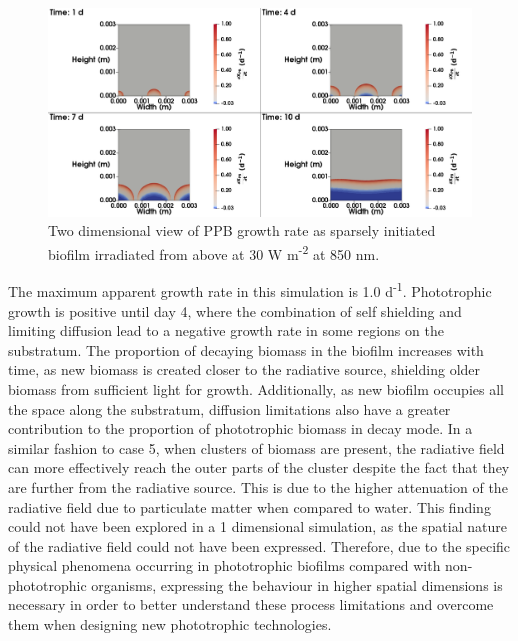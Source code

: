 \begin{figure}[H]
    \centering
    \hspace*{-1cm}\includegraphics[width=1.1\textwidth,height=0.4\textheight]{Chap4/methods/data/figures/case6_growth_frac.png}
    \caption{Two dimensional view of PPB growth rate as sparsely initiated biofilm irradiated from above at 30 W m\textsuperscript{-2} at 850 nm.} 
    \label{fig:case6_growth_frac}
\end{figure}
The maximum apparent growth rate in this simulation is 1.0 d\textsuperscript{-1}. Phototrophic growth is positive until day 4, where the combination of self shielding and limiting diffusion lead to a negative growth rate in some regions on the substratum. The proportion of decaying biomass in the biofilm increases with time, as new biomass is created closer to the radiative source, shielding older biomass from sufficient light for growth. Additionally, as new biofilm occupies all the space along the substratum, diffusion limitations also have a greater contribution to the proportion of phototrophic biomass in decay mode. In a similar fashion to case 5, when clusters of biomass are present, the radiative field can more effectively reach the outer parts of the cluster despite the fact that they are further from the radiative source. This is due to the higher attenuation of the radiative field due to particulate matter when compared to water. This finding could not have been explored in a 1 dimensional simulation, as the spatial nature of the radiative field could not have been expressed. Therefore, due to the specific physical phenomena occurring in phototrophic biofilms compared with non-phototrophic organisms, expressing the behaviour in higher spatial dimensions is necessary in order to better understand these process limitations and overcome them when designing new phototrophic technologies.




